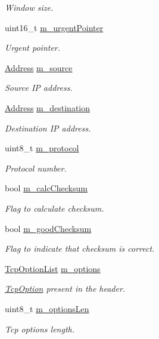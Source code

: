 \begin{DoxyCompactItemize}
\begin{DoxyCompactList}\small\item\em Window size. \end{DoxyCompactList}\item 
uint16\+\_\+t \hyperlink{classns3_1_1TcpHeader_a06c558a3586f9756e6a18165dee3399d}{m\+\_\+urgent\+Pointer}
\begin{DoxyCompactList}\small\item\em Urgent pointer. \end{DoxyCompactList}\item 
\hyperlink{classns3_1_1Address}{Address} \hyperlink{classns3_1_1TcpHeader_a0babcb8b153019eaa0e477bedf0ae716}{m\+\_\+source}
\begin{DoxyCompactList}\small\item\em Source IP address. \end{DoxyCompactList}\item 
\hyperlink{classns3_1_1Address}{Address} \hyperlink{classns3_1_1TcpHeader_a8e272fcbe69041005e319f0e4aa1d5ab}{m\+\_\+destination}
\begin{DoxyCompactList}\small\item\em Destination IP address. \end{DoxyCompactList}\item 
uint8\+\_\+t \hyperlink{classns3_1_1TcpHeader_a92deaf7af6f6d4fba270fd9979b2a49b}{m\+\_\+protocol}
\begin{DoxyCompactList}\small\item\em Protocol number. \end{DoxyCompactList}\item 
bool \hyperlink{classns3_1_1TcpHeader_a75e3fab988b34ad7406eff0134c1777c}{m\+\_\+calc\+Checksum}
\begin{DoxyCompactList}\small\item\em Flag to calculate checksum. \end{DoxyCompactList}\item 
bool \hyperlink{classns3_1_1TcpHeader_abff3dc7bf583a246c51ffcd2055ff059}{m\+\_\+good\+Checksum}
\begin{DoxyCompactList}\small\item\em Flag to indicate that checksum is correct. \end{DoxyCompactList}\item 
\hyperlink{classns3_1_1TcpHeader_ac28e919e2a5be37ada2b8f06cb0c4d4a}{Tcp\+Option\+List} \hyperlink{classns3_1_1TcpHeader_af0a6b523e1769d521e2a90caa1c8b4d2}{m\+\_\+options}
\begin{DoxyCompactList}\small\item\em \hyperlink{classns3_1_1TcpOption}{Tcp\+Option} present in the header. \end{DoxyCompactList}\item 
uint8\+\_\+t \hyperlink{classns3_1_1TcpHeader_a36cbd14a45d74bfd2645f6a2f6772c7d}{m\+\_\+options\+Len}
\begin{DoxyCompactList}\small\item\em Tcp options length. \end{DoxyCompactList}\end{DoxyCompactItemize}

